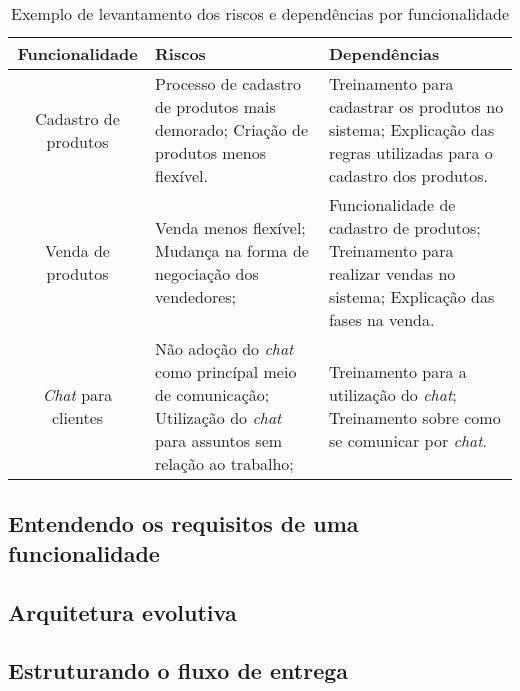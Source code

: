     \begin{table}[h!]
      \centering
      \begin{tabular}{|c|p{4cm}|p{6cm}|}
        \hline
        \textbf{Funcionalidade} &
        \textbf{Riscos}  &
        \textbf{Dependências}
        \\ \hline
        Cadastro de produtos &
        Processo de cadastro de produtos mais demorado; \newline
        Criação de produtos menos flexível. &
        Treinamento para cadastrar os produtos no sistema;\newline
        Explicação das regras utilizadas para o cadastro dos produtos.
        \\ \hline
        Venda de produtos &
        Venda menos flexível; \newline
        Mudança na forma de negociação dos vendedores; &
        Funcionalidade de cadastro de produtos; \newline
        Treinamento para realizar vendas no sistema; \newline
        Explicação das fases na venda.
        \\ \hline
        \textit{Chat} para clientes &
        Não adoção do \textit{chat} como princípal meio de comunicação; \newline
        Utilização do \textit{chat} para assuntos sem relação ao trabalho; &
        Treinamento para a utilização do \textit{chat}; \newline
        Treinamento sobre como se comunicar por \textit{chat}.
        \\ \hline
      \end{tabular}
      \caption{Exemplo de levantamento dos riscos e dependências por funcionalidade}
      \label{Tabela:3}
    \end{table}

    \subsection{Entendendo os requisitos de uma funcionalidade}
    \subsection{Arquitetura evolutiva}
    \subsection{Estruturando o fluxo de entrega}
